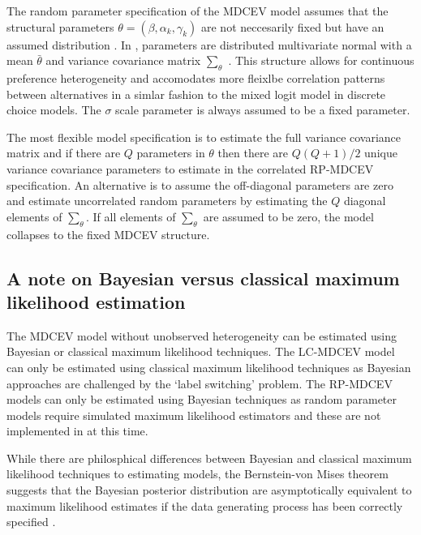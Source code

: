 The random parameter specification of the MDCEV model assumes that the
structural parameters \(\theta = (\beta, \alpha_k , \gamma_k)\) are not
neccesarily fixed but have an assumed distribution
\citep{bhatmultiple2008}. In , parameters are distributed
multivariate normal with a mean \(\bar{\theta}\) and variance covariance
matrix \(\sum_{\theta}\) \citep{vonhaefenkuhn-tucker2005}. This
structure allows for continuous preference heterogeneity and accomodates
more fleixlbe correlation patterns between alternatives in a simlar
fashion to the mixed logit model in discrete choice models. The
\(\sigma\) scale parameter is always assumed to be a fixed parameter.

The most flexible model specification is to estimate the full variance
covariance matrix and if there are \(Q\) parameters in \(\theta\) then
there are \(Q(Q+1)/2\) unique variance covariance parameters to estimate
in the correlated RP-MDCEV specification. An alternative is to assume
the off-diagonal parameters are zero and estimate uncorrelated random
parameters by estimating the \(Q\) diagonal elements of
\(\sum_{\theta}\). If all elements of \(\sum_{\theta}\) are assumed to
be zero, the model collapses to the fixed MDCEV structure.

\hypertarget{a-note-on-bayesian-versus-classical-maximum-likelihood-estimation}{%
\subsection{A note on Bayesian versus classical maximum likelihood
estimation}\label{a-note-on-bayesian-versus-classical-maximum-likelihood-estimation}}

The MDCEV model without unobserved heterogeneity can be estimated using
Bayesian or classical maximum likelihood techniques. The LC-MDCEV model
can only be estimated using classical maximum likelihood techniques as
Bayesian approaches are challenged by the `label switching' problem. The
RP-MDCEV models can only be estimated using Bayesian techniques as
random parameter models require simulated maximum likelihood estimators
and these are not implemented in  at this time.

While there are philosphical differences between Bayesian and classical
maximum likelihood techniques to estimating models, the Bernstein-von
Mises theorem suggests that the Bayesian posterior distribution are
asymptotically equivalent to maximum likelihood estimates if the data
generating process has been correctly specified
\citep{traindiscrete2003}.


